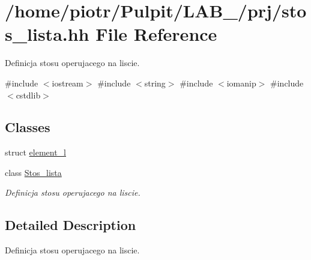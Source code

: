 \hypertarget{stos__lista_8hh}{\section{/home/piotr/\-Pulpit/\-L\-A\-B\-\_/prj/stos\-\_\-lista.hh \-File \-Reference}
\label{stos__lista_8hh}
}


\-Definicja stosu operujacego na liscie.  


{\ttfamily \#include $<$iostream$>$}\*
{\ttfamily \#include $<$string$>$}\*
{\ttfamily \#include $<$iomanip$>$}\*
{\ttfamily \#include $<$cstdlib$>$}\*
\subsection*{\-Classes}
\begin{DoxyCompactItemize}
\item 
struct \hyperlink{structelement__l}{element\-\_\-l}
\item 
class \hyperlink{class_stos__lista}{\-Stos\-\_\-lista}
\begin{DoxyCompactList}\small\item\em \-Definicja stosu operujacego na liscie. \end{DoxyCompactList}\end{DoxyCompactItemize}


\subsection{\-Detailed \-Description}
\-Definicja stosu operujacego na liscie. 